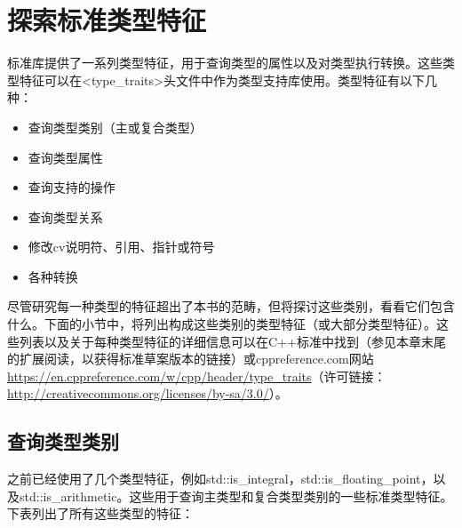 \section{探索标准类型特征}

标准库提供了一系列类型特征，用于查询类型的属性以及对类型执行转换。这些类型特征可以在<type_traits>头文件中作为类型支持库使用。类型特征有以下几种：

\begin{itemize}
  \item 查询类型类别（主或复合类型）
  \item 查询类型属性
  \item 查询支持的操作
  \item 查询类型关系
  \item 修改cv说明符、引用、指针或符号
  \item 各种转换
\end{itemize}

尽管研究每一种类型的特征超出了本书的范畴，但将探讨这些类别，看看它们包含什么。下面的小节中，将列出构成这些类别的类型特征（或大部分类型特征）。这些列表以及关于每种类型特征的详细信息可以在C++标准中找到（参见本章末尾的扩展阅读，以获得标准草案版本的链接）或cppreference.com网站\url{https://en.cppreference.com/w/cpp/header/type_traits}（许可链接：\url{http://creativecommons.org/licenses/by-sa/3.0/}）。

\subsection{查询类型类别}

之前已经使用了几个类型特征，例如std::is_integral，std::is_floating_point，以及std::is_arithmetic。这些用于查询主类型和复合类型类别的一些标准类型特征。下表列出了所有这些类型的特征：

